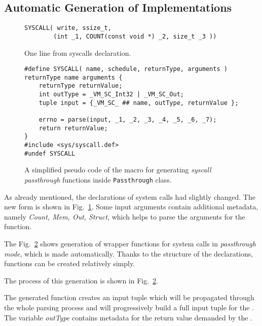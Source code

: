 \subsection{Automatic Generation of Implementations} \label{sec:passthrough:functions}

\begin{figure}[h!]
\begin{lstlisting}[style=Macro]
SYSCALL( write, ssize_t,
        (int _1, COUNT(const void *) _2, size_t _3 ))
\end{lstlisting}
\caption{
    One line from syscalls declaration.
}
\label{fig:passthrough:declaration}
\end{figure}


\begin{figure}[h!]
\begin{lstlisting}[style=Macro]
#define SYSCALL( name, schedule, returnType, arguments ) 
returnType name arguments {
    returnType returnValue;
    int outType = _VM_SC_Int32 | _VM_SC_Out;
    tuple input = {_VM_SC_ ## name, outType, returnValue };

    errno = parse(input, _1, _2, _3, _4, _5, _6, _7);
    return returnValue;
}
#include <sys/syscall.def>
#undef SYSCALL
\end{lstlisting}
\caption{
    A simplified pseudo code of the macro for generating \textit{syscall passthrough} functions inside \texttt{Passthrough} class.
}
\label{fig:passthrough:functions}
\end{figure}

As already mentioned, the declarations of system calls had slightly changed. The new form is shown in Fig.~\ref{fig:passthrough:declaration}. Some input arguments contain additional metadata, namely \textit{Count, Mem, Out, Struct}, which helps to parse the arguments for the \vmsyscall function.

The Fig.~\ref{fig:passthrough:functions} shows generation of wrapper functions for system calls in \textit{passthrough mode}, which is made automatically. Thanks to the structure of the declarations, functions can be created relatively simply.

The process of this generation is shown in Fig.~\ref{fig:passthrough:functions}.

The generated function creates an input tuple which will be propagated through the whole parsing process and will progressively build a full input tuple for the \vmsyscall. The variable \textit{outType} contains metadata for the return value demanded by the \vmsyscall.

